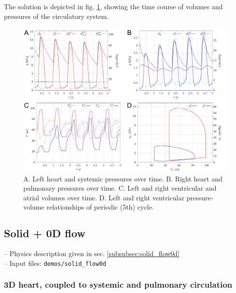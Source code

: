 \documentclass[a4paper,12pt]{report}
\begin{document}
The solution is depicted in fig. \ref{fig:syspul_results}, showing the time course of volumes and pressures of the circulatory system.

\begin{figure}
\centering
\includegraphics[width=1.0\textwidth]{fig/syspul_results.png}
\caption{A. Left heart and systemic pressures over time. B. Right heart and pulmonary pressures over time. C. Left and right ventricular and atrial volumes over time. D. Left and right ventricular pressure-volume relationships of periodic (5th) cycle.}
\label{fig:syspul_results}
\end{figure}


\subsection{Solid + 0D flow}\label{subsec:demos:solid_flow0d}

-- Physics description given in sec. \ref{subsubsec:solid_flow0d}\\

-- Input files: \verb"demos/solid_flow0d"

\subsubsection*{3D heart, coupled to systemic and pulmonary circulation}
\end{document}
